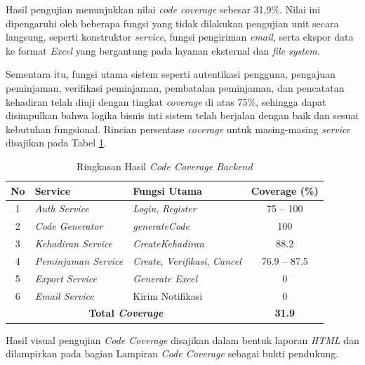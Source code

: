 Hasil pengujian menunjukkan nilai \textit{code coverage} sebesar 31,9\%. Nilai ini dipengaruhi oleh beberapa fungsi yang tidak dilakukan pengujian unit secara langsung, seperti konstruktor \textit{service}, fungsi pengiriman \textit{email}, serta ekspor data ke format \textit{Excel} yang bergantung pada layanan eksternal dan \textit{file system}.
    
\newpage
Sementara itu, fungsi utama sistem seperti autentikasi pengguna, pengajuan peminjaman, verifikasi peminjaman, pembatalan peminjaman, dan pencatatan kehadiran telah diuji dengan tingkat \textit{coverage} di atas 75\%, sehingga dapat disimpulkan bahwa logika bisnis inti sistem telah berjalan dengan baik dan sesuai kebutuhan fungsional. Rincian persentase \textit{coverage} untuk masing-masing \textit{service} disajikan pada Tabel \ref{tab:hasil_code_coverage}.

\begin{table}[htbp]
    \centering
    \caption{Ringkasan Hasil \textit{Code Coverage Backend}}
    \label{tab:hasil_code_coverage}
    \begin{tabularx}{\textwidth}{|c|l|X|c|}
        \hline
        No & Service & Fungsi Utama & Coverage (\%) \\
        \hline
        1 & \textit{Auth Service} & \textit{Login}, \textit{Register} & 75 -- 100 \\
        \hline
        2 & \textit{Code Generator} & \textit{generateCode} & 100 \\
        \hline
        3 & \textit{Kehadiran Service} & \textit{CreateKehadiran} & 88.2 \\
        \hline
        4 & \textit{Peminjaman Service} & \textit{Create}, \textit{Verifikasi}, \textit{Cancel} & 76.9 -- 87.5 \\
        \hline
        5 & \textit{Export Service} & \textit{Generate Excel} & 0 \\
        \hline
        6 & \textit{Email Service} & Kirim Notifikasi & 0 \\
        \hline
        \multicolumn{3}{|c|}{\textbf{Total \textit{Coverage}}} & \textbf{31.9} \\
        \hline
    \end{tabularx}
\end{table}

Hasil visual pengujian \textit{Code Coverage} disajikan dalam bentuk laporan \textit{HTML} dan dilampirkan pada bagian Lampiran \textit{Code Coverage} sebagai bukti pendukung.


